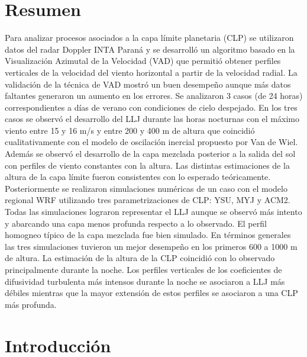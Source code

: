 \documentclass[12pt,spanish,oneside, a4paper]{book}
\begin{document}
\chapter*{Resumen}\begin{center}\begin{minipage}{\dimexpr\paperwidth-7cm}
Para analizar procesos asociados a la capa límite planetaria (CLP) se utilizaron datos del radar Doppler INTA Paraná y se desarrolló un algoritmo basado en la Visualización Azimutal de la Velocidad (VAD) que permitió obtener perfiles verticales de la velocidad del viento horizontal a partir de la velocidad radial. La validación de la técnica de VAD mostró un buen desempeño aunque más datos faltantes generaron un aumento en los errores. Se analizaron 3 casos (de 24 horas) correspondientes a días de verano con condiciones de cielo despejado. En los tres casos se observó el desarrollo del LLJ durante las horas nocturnas con el máximo viento entre 15 y 16 m/s y entre 200 y 400 m de altura que coincidió cualitativamente con el modelo de oscilación inercial propuesto por Van de Wiel. Además se observó el desarrollo de la capa mezclada posterior a la salida del sol con perfiles de viento constantes con la altura. Las distintas estimaciones de la altura de la capa límite fueron consistentes con lo esperado teóricamente. Posteriormente se realizaron simulaciones numéricas de un caso con el modelo regional WRF utilizando tres parametrizaciones de CLP: YSU, MYJ y ACM2. Todas las simulaciones lograron representar el LLJ aunque se observó más intento y abarcando una capa menos profunda respecto a lo observado. El perfil homogneo típico de la capa mezclada fue bien simulado. En términos generales las tres simulaciones tuvieron un mejor desempeño en los primeros 600 a 1000 m de altura. La estimación de la altura de la CLP coincidió con lo observado principalmente durante la noche. Los perfiles verticales de los coeficientes de difusividad turbulenta más intensos durante la noche se asociaron a LLJ más débiles mientras que la mayor extensión de estos perfiles se asociaron a una CLP más profunda.
\end{minipage}
\end{center}\newpage

\setcounter{tocdepth}{4} \tableofcontents

\listoffigures
\newpage

\listoftables
\newpage

\chapter{Introducción}\label{introduccion}
\end{document}
